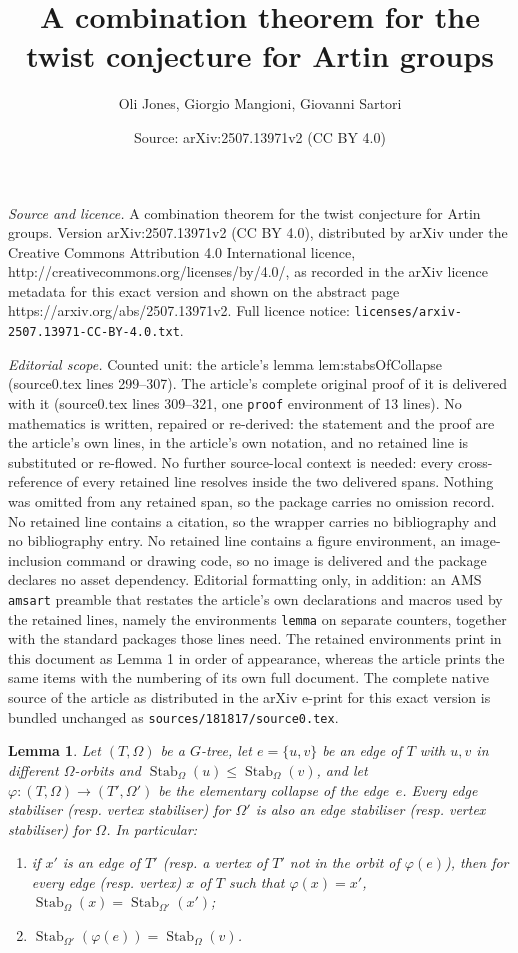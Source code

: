 \documentclass[10pt,a4paper]{amsart}
\title{A combination theorem for the twist conjecture for Artin groups}
\author{Oli Jones, Giorgio Mangioni, Giovanni Sartori}
\date{Source: arXiv:2507.13971v2 (CC BY 4.0)}
\newtheorem{lemma}{Lemma}
\newcommand{\Stab}[2]{\operatorname{Stab}_{#1}\left(#2\right)}
\renewcommand{\phi}{\varphi}
\begin{document}
\maketitle

\noindent\emph{Source and licence.} A combination theorem for the twist conjecture for Artin groups. Version arXiv:2507.13971v2 (CC BY 4.0), distributed by arXiv under the Creative Commons Attribution 4.0 International licence, http://creativecommons.org/licenses/by/4.0/, as recorded in the arXiv licence metadata for this exact version and shown on the abstract page https://arxiv.org/abs/2507.13971v2. Full licence notice: \texttt{licenses/arxiv-2507.13971-CC-BY-4.0.txt}.\par\smallskip

\noindent\textit{Editorial scope.} Counted unit: the article's lemma lem:stabsOfCollapse (source0.tex lines 299--307). The article's complete original proof of it is delivered with it (source0.tex lines 309--321, one \texttt{proof} environment of 13 lines). No mathematics is written, repaired or re-derived: the statement and the proof are the article's own lines, in the article's own notation, and no retained line is substituted or re-flowed.  No further source-local context is needed: every cross-reference of every retained line resolves inside the two delivered spans.  Nothing was omitted from any retained span, so the package carries no omission record.  No retained line contains a citation, so the wrapper carries no bibliography and no bibliography entry.  No retained line contains a figure environment, an image-inclusion command or drawing code, so no image is delivered and the package declares no asset dependency.  Editorial formatting only, in addition: an AMS \texttt{amsart} preamble that restates the article's own declarations and macros used by the retained lines, namely the environments \texttt{lemma} on separate counters, together with the standard packages those lines need.  The retained environments print in this document as Lemma 1 in order of appearance, whereas the article prints the same items with the numbering of its own full document.  The complete native source of the article as distributed in the arXiv e-print for this exact version is bundled unchanged as \texttt{sources/181817/source0.tex}.
\begin{lemma}
    \label{lem:stabsOfCollapse}
    Let $(T,\Omega)$ be a $G$-tree, let $e=\{u,v\}$ be an edge of $T$ with $u,v$ in different $\Omega$-orbits and $\Stab \Omega u\le\Stab\Omega v$, and let $\phi\colon(T,\Omega)\to(T',\Omega')$ be the elementary collapse of the edge~$e$. Every edge stabiliser (resp. vertex stabiliser) for $\Omega'$ is also an edge stabiliser (resp. vertex stabiliser) for $\Omega$.
     In particular:
    \begin{enumerate}
        \item if $x'$ is an edge of $T'$ (resp. a vertex of $T'$ not in the orbit of $\phi(e)$), then for every edge (resp. vertex) $x$ of $T$ such that $\phi(x) = x'$, $\Stab\Omega x=\Stab{\Omega'}{x'}$;
        \item $\Stab{\Omega'}{\phi(e)}=\Stab\Omega v$.
    \end{enumerate}
\end{lemma}
\end{document}
